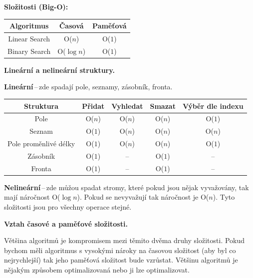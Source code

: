 \textbf{Složitosti (Big-O):}

\begin{table}[h]
    \centering
    \begin{tabular}{|c|c|c|}\hline
         Algoritmus & Časová & Paměťová\\\hline
         Linear Search & O($n$) & O($1$)\\\hline
         Binary Search & O($\log n$) & O($1$)\\\hline
    \end{tabular}
\end{table}


\vspace{1cm}
\begin{Large}\vspace{0,5cm} \textbf{Lineární a nelineární struktury.}
\end{Large}

\textbf{Lineární}\,--\,zde spadají pole, seznamy, zásobník, fronta.
\begin{table}[h]
    \centering
    \begin{tabular}{|c|c|c|c|c|}\hline
         Struktura & Přidat & Vyhledat & Smazat & Výběr dle indexu\\\hline
         Pole & O($n$) & O($n$) & O($n$) & O($1$) \\\hline
         Seznam & O($1$) & O($n$) & O($n$) & O($n$)\\\hline
         Pole proměnlivé délky & O($1$) & O($n$) & O($n$) & O($1$) \\\hline
         Zásobník & O($1$) & -- & O($1$) & -- \\\hline
         Fronta & O($1$) & -- & O($1$) & -- \\\hline
    \end{tabular}
\end{table}

\textbf{Nelineární}\,--\,zde můžou spadat stromy, které pokud jsou nějak vyvažovány, tak mají náročnost O($\log{n}$). Pokud se nevyvažují tak náročnost je O($n$). Tyto složitosti jsou pro všechny operace stejné.

\begin{Large}\vspace{0,5cm} \textbf{Vztah časové a paměťové složitosti.}
\end{Large}

Většina algoritmů je kompromisem mezi těmito dvěma druhy složitosti. Pokud bychom měli algoritmus s vysokými nároky na časovou složitost (aby byl co nejrychlejší) tak jeho paměťová složitost bude vzrůstat. Většinu algoritmů je nějakým způsobem optimalizovaná nebo ji lze optimalizovat.

